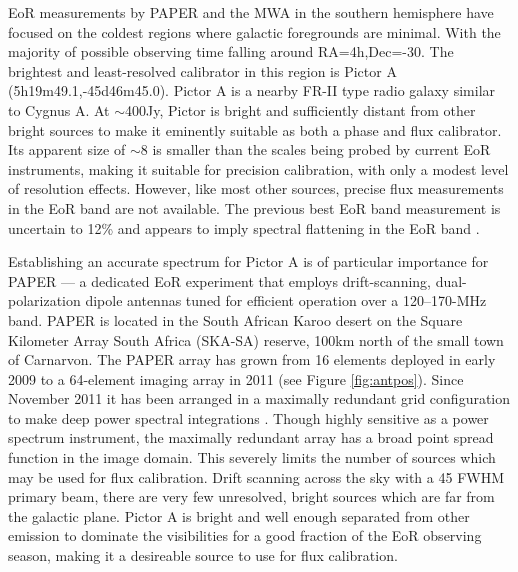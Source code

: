 \documentclass[preprint]{aastex}
\begin{document}
EoR measurements by PAPER and the MWA in the southern hemisphere have focused on the coldest regions where
galactic foregrounds are minimal. With the majority of possible observing time falling around
RA=4h,Dec=-30. The brightest and least-resolved calibrator in this region is Pictor A 
(5h19m49.1,-45d46m45.0). Pictor A is a nearby FR-II type radio galaxy 
 similar to Cygnus A.  At $\sim$400Jy, Pictor is bright and sufficiently distant from other 
bright sources to make it eminently suitable as both a phase and flux calibrator. Its apparent
size of $\sim$8\arcmin{} is smaller than the scales being probed by current EoR instruments, 
making it suitable for precision calibration, with only a modest
level of resolution effects.
However, 
like most other sources, precise flux measurements in the EoR band are not available.
The previous best EoR band measurement
is uncertain to 12\% and appears to imply spectral flattening in the EoR band
\citep{Perley:1997p9312}. 
 

Establishing an accurate spectrum for Pictor A is of particular importance for
PAPER --- a dedicated EoR experiment 
that employs drift-scanning, dual-polarization dipole antennas 
tuned for efficient operation over a 120--170-MHz band.  PAPER is located in the South African Karoo desert
on the Square Kilometer Array
South Africa (SKA-SA) reserve, 100km north of the small town of Carnarvon.
The PAPER array has grown from 16 elements deployed in early 2009 to a
64-element imaging array in 2011 (see Figure \ref{fig:antpos}). 
Since November 2011 it has been arranged in a maximally redundant grid 
configuration to make deep power spectral integrations \citep{Parsons:2012p9028}.
Though highly sensitive as a power spectrum instrument, the maximally redundant array 
has a broad point spread function in the image domain. This severely limits the number 
of sources which may be used for flux calibration. Drift scanning across the sky with a 45\arcdeg{} FWHM
primary beam, there are very few unresolved, bright sources which are far from the galactic plane. 
Pictor A is bright and well enough separated from other emission to dominate the visibilities for a good fraction of
the EoR observing season, making it a desireable source to use for flux calibration.
\end{document}
